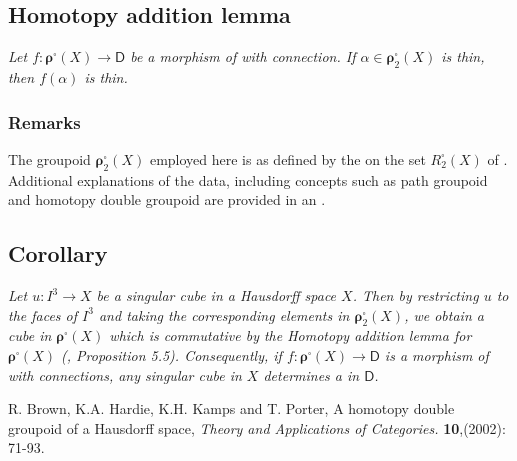 \documentclass[12pt]{article}
\theoremstyle{plain}
\theoremstyle{definition}
\numberwithin{equation}{section}
\begin{document}
\subsection{Homotopy addition lemma} 

\emph{Let $f: \boldsymbol{\rho}^\square(X) \to \mathsf D$ be a morphism of 
with connection.  If $\alpha \in {\boldsymbol{\rho}^\square_2}(X)$ is thin,  then $f(\alpha)$ 
is thin.}

\subsubsection{Remarks}
  The groupoid ${\boldsymbol{\rho}^\square_2}(X)$ employed here is as defined by the
 on the set 
$R^{\square}_2(X)$ of . Additional explanations of the data, including concepts such as path groupoid and homotopy double groupoid are provided in an 
.

\subsection{Corollary}
  
 \emph{Let $u : I^3\to X$ be a singular cube in a Hausdorff space $X$.
Then by restricting $u$ to the faces of $I^3$ and taking the
corresponding elements in $\boldsymbol{\rho}^{\square}_2 (X)$, we obtain a
cube in $\boldsymbol{\rho}^{\square} (X)$ which is commutative by the Homotopy
addition lemma for $\boldsymbol{\rho}^{\square} (X)$ (\cite{BHKP}, Proposition
5.5). Consequently, if $f : \boldsymbol{\rho}^{\square} (X)\to \mathsf{D}$ is
a morphism of 
 with connections, any singular cube
in $X$ determines a 
 in $\mathsf{D}$.}

\begin{thebibliography}{9}
R. Brown, K.A. Hardie, K.H. Kamps  and T. Porter, A homotopy double groupoid of a Hausdorff 
space, {\it Theory and Applications of Categories.} \textbf{10},(2002): 71-93.

\end{thebibliography}
\end{document}
